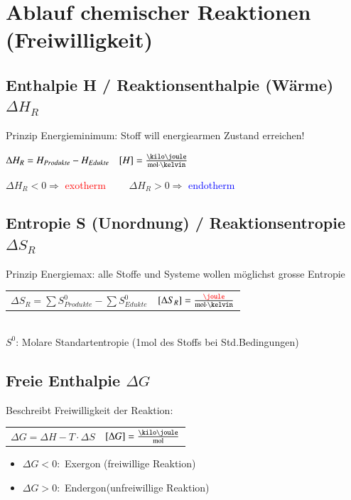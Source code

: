 \section{Ablauf chemischer Reaktionen (Freiwilligkeit)}

\subsection{Enthalpie H / Reaktionsenthalpie (Wärme) $\Delta H_R$}
    Prinzip Energieminimum: Stoff will energiearmen Zustand erreichen!

    $\Delta H_R = H_{Produkte} - H_{Edukte} \quad [H] = \frac{\kilo\joule}{\mol \cdot \kelvin}$

    $\Delta H_R < 0 \Rightarrow$ \textcolor{red}{exotherm} $\qquad \Delta H_R > 0 \Rightarrow$ \textcolor{blue}{endotherm}

\subsection{Entropie S (Unordnung) / Reaktionsentropie $\Delta S_R$}
    Prinzip Energiemax: alle Stoffe und Systeme wollen möglichst grosse Entropie

    \begin{tabular}{p{5.5cm}l}
        $\Delta S_R = \sum S^0_{Produkte} - \sum S^0_{Edukte}$ & $[\Delta S_R] = \frac{\color{red}\joule}{\mol \cdot \kelvin}$
    \end{tabular}\\
    $S^0$: Molare Standartentropie (1mol des Stoffs bei Std.Bedingungen)
\subsection{Freie Enthalpie $\Delta G$}
    Beschreibt Freiwilligkeit der Reaktion:

    \begin{tabular}{p{5.5cm}l}
        $\Delta G = \Delta H - T \cdot \Delta S$ & $[\Delta G] = \frac{\kilo\joule}{\mol}$
    \end{tabular}
    \begin{itemize}
        \item $\Delta G < 0:$ Exergon (freiwillige Reaktion)
        \item $\Delta G > 0:$ Endergon(unfreiwillige Reaktion)
    \end{itemize}

